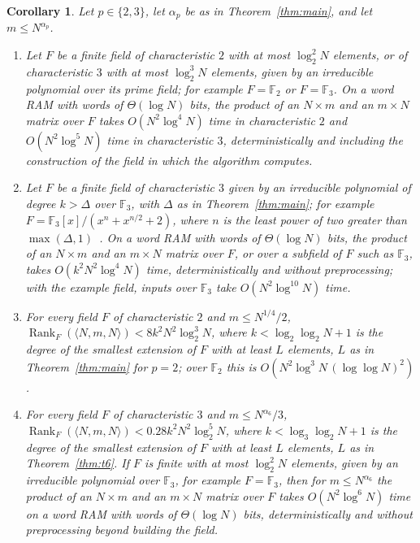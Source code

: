 \documentclass[11pt]{article}
\newtheorem{corollary}[theorem]{Corollary}
\theoremstyle{definition}
\theoremstyle{remark}
\newcommand{\F}{\mathbb{F}}
\newcommand{\Rank}{\operatorname{Rank}}
\begin{document}
\begin{corollary}\label{cor:williams}
Let $p\in\{2,3\}$, let $\alpha_p$ be as in Theorem~\ref{thm:main}, and let $m\le N^{\alpha_p}$.
\begin{enumerate}[label=(\roman*),nosep]
\item Let $F$ be a finite field of characteristic $2$ with at most $\log_2^2N$ elements, or of characteristic $3$ with at most $\log_2^3N$ elements, given by an irreducible polynomial over its prime field; for example $F=\F_2$ or $F=\F_3$. On a word RAM with words of $\Theta(\log N)$ bits, the product of an $N\times m$ and an $m\times N$ matrix over $F$ takes $O(N^2\log^4N)$ time in characteristic $2$ and $O(N^2\log^5N)$ time in characteristic $3$, deterministically and including the construction of the field in which the algorithm computes.
\item Let $F$ be a finite field of characteristic $3$ given by an irreducible polynomial of degree $k>\Delta$ over $\F_3$, with $\Delta$ as in Theorem~\ref{thm:main}; for example $F=\F_3[x]/(x^n+x^{n/2}+2)$, where $n$ is the least power of two greater than $\max(\Delta,1)$~\cite[Theorem~3.35]{LN97}. On a word RAM with words of $\Theta(\log N)$ bits, the product of an $N\times m$ and an $m\times N$ matrix over $F$, or over a subfield of $F$ such as $\F_3$, takes $O(k^2N^2\log^4N)$ time, deterministically and without preprocessing; with the example field, inputs over $\F_3$ take $O(N^2\log^{10}N)$ time.
\item For every field $F$ of characteristic $2$ and $m\le N^{1/4}/2$, $\Rank_F(\langle N,m,N\rangle)<8k^2N^2\log_2^3N$, where $k<\log_2\log_2N+1$ is the degree of the smallest extension of $F$ with at least $L$ elements, $L$ as in Theorem~\ref{thm:main} for $p=2$; over $\F_2$ this is $O(N^2\log^3N\,(\log\log N)^2)$.
\item For every field $F$ of characteristic $3$ and $m\le N^{\alpha_6}/3$, $\Rank_F(\langle N,m,N\rangle)<0.28k^2N^2\log_2^5N$, where $k<\log_3\log_2N+1$ is the degree of the smallest extension of $F$ with at least $L$ elements, $L$ as in Theorem~\ref{thm:t6}. If $F$ is finite with at most $\log_2^2N$ elements, given by an irreducible polynomial over $\F_3$, for example $F=\F_3$, then for $m\le N^{\alpha_6}$ the product of an $N\times m$ and an $m\times N$ matrix over $F$ takes $O(N^2\log^6N)$ time on a word RAM with words of $\Theta(\log N)$ bits, deterministically and without preprocessing beyond building the field.
\end{enumerate}
\end{corollary}
\end{document}
